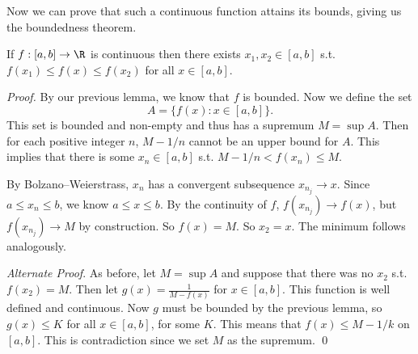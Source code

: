 Now we can prove that such a continuous function attains its bounds, giving us the boundedness theorem.

\begin{theorem}
	If $f:[a, b] \rightarrow \R$ is continuous then there exists $x_1, x_2 \in [a, b]$ s.t. $f(x_1) \leq f(x) \leq f(x_2)$ for all $x \in [a, b]$.
\end{theorem}
\begin{proof}
	By our previous lemma, we know that $f$ is bounded. Now we define the set
	$$
	A = \{f(x) : x \in [a, b]\}.
	$$
	This set is bounded and non-empty and thus has a supremum $M = \sup A$. Then for each positive integer $n$, $M - 1/n$ cannot be an upper bound for $A$. This implies that there is some $x_n \in [a, b]$ s.t. $M - 1/n < f(x_n) \leq M$.

	By Bolzano–Weierstrass, $x_n$ has a convergent subsequence $x_{n_j} \rightarrow x$. Since $a \leq x_n \leq b$, we know $a \leq x \leq b$. By the continuity of $f$, $f(x_{n_j}) \rightarrow f(x)$, but $f(x_{n_j}) \rightarrow M$ by construction. 
	So $f(x) = M$. So $x_2 = x$. The minimum follows analogously. \qedhere

	\emph{Alternate Proof}. As before, let $M = \sup A$ and suppose that there was no $x_2$ s.t. $f(x_2) = M$. Then let $g(x) = \frac{1}{M - f(x)}$ for $x \in [a, b]$. This function is well defined and continuous. Now $g$ must be bounded by the previous lemma, so $g(x) \leq K$ for all $x \in [a, b]$, for some $K$. This means that $f(x) \leq M - 1/k$ on $[a, b]$. This is contradiction since we set $M$ as the supremum. \hfill\qed
\end{proof}

\clearpage
